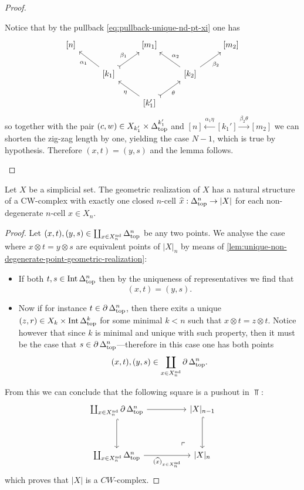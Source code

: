 \begin{proof}
\begin{itemize}
  Notice that by the pullback \cref{eq:pullback-unique-nd-pt-xi} one has
  \[
  \begin{tikzcd}
  {[n]} & &{[m_1]} & &{[m_2]}
  \\
  &{[k_1]} \ar[ul, "\alpha_1"]
  \ar[ru, tail, "\beta_1"]
  &
  &{[k_2]} \ar[ru, "\beta_2"']
  \ar[lu, "\alpha_2"']
  &
  \\
  & &{[k_1']} \ar[ul, "\eta"] \ar[ru, tail, "\theta"'] & &
  \end{tikzcd}
  \]
  so together with the pair \((c, w) \in X_{k_1'} \times \Delta_{\text{top}}^{k_1'}\) and
  \([n] \overset{\alpha_1 \eta} \longleftarrow [k_1'] \overset{\beta_2
    \theta}\longrightarrow [m_2]\) we can shorten the zig-zag length by one,
  yielding the case \(N - 1\), which is true by hypothesis. Therefore
  \((x, t) = (y, s)\) and the lemma follows.
\end{itemize}
\end{proof}

\begin{theorem}
\label{thm:geometric-realization-is-CW-complex}
Let \(X\) be a simplicial set. The geometric realization of \(X\) has a natural
structure of a CW-complex with exactly one closed \(n\)-cell
\(\widehat x: \Delta_{\text{top}}^n \to |X|\) for each non-degenerate \(n\)-cell
\(x \in X_n\).
\end{theorem}

\begin{proof}
Let \((x, t), (y, s) \in \coprod_{x \in X_n^{\operatorname{nd}}} \Delta_{\text{top}}^n\) be any two
points.  We analyse the case where \(x \otimes t = y \otimes s\) are equivalent
points of \(|X|_n\) by means of
\cref{lem:unique-non-degenerate-point-geometric-realization}:
\begin{itemize}\setlength\itemsep{0em}
\item If both \(t, s \in \operatorname{Int} \Delta_{\text{top}}^n\) then by the uniqueness of
  representatives we find that
  \[
  (x, t) = (y, s).
  \]

\item Now if for instance \(t \in \operatorname{\partial} \Delta_{\text{top}}^n\), then there exits a
  unique \((z, r) \in X_k \times \operatorname{Int} \Delta_{\text{top}}^k\) for some minimal \(k < n\)
  such that \(x \otimes t = z \otimes t\). Notice however that since \(k\) is
  minimal and unique with such property, then it must be the case that
  \(s \in \operatorname{\partial} \Delta_{\text{top}}^n\)---therefore in this case one has both points
  \[
  (x, t), (y, s) \in \coprod_{x \in X_n^{\operatorname{nd}}} \operatorname{\partial} \Delta_{\text{top}}^n.
  \]
\end{itemize}
From this we can conclude that the following square is a pushout in \(\Top\):
\[
\begin{tikzcd}
\coprod_{x \in X_n^{\Nondeg}} \Bd \splxtop^n
\ar[dd, hook]
\ar[rr]
\ar[rdrd, "\ulcorner", phantom, very near end]
&&{|X|_{n-1}} \ar[dd, hook]
\\
&&
\\
\coprod_{x \in X_n^{\Nondeg}} \splxtop^n
\ar[rr, "(\widehat x)_{x \in X_n^{\Nondeg}}"']
&&{|X|_n}
\end{tikzcd}
\]
which proves that \(|X|\) is a \(CW\)-complex.
\end{proof}

